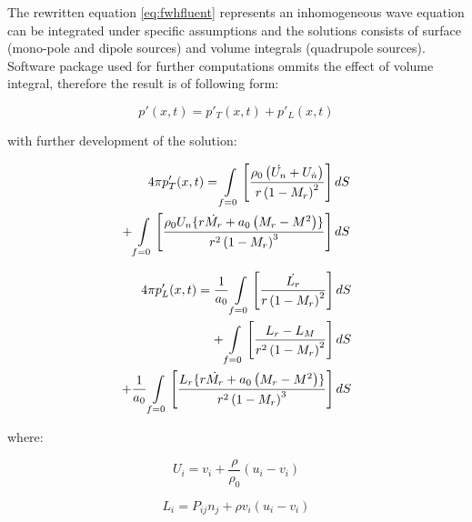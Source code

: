 The rewritten equation \ref{eq:fwhfluent} represents an inhomogeneous wave equation can be integrated under specific assumptions and the solutions consists of surface (mono-pole and dipole sources) and volume integrals (quadrupole sources). Software package used for further computations ommits the effect of volume integral, therefore the result is of following form:

\begin{equation} \label{eq:fwhfluentsolved}
p'(x, t) = p'_T(x, t) + p'_L(x, t)
\end{equation}

\noindent with further development of the solution:

\begin{equation} \label{eq:fwhfluentpt}
\begin{split}
4 \pi p'_T (x, t)
= \int\displaylimits_{f=0} \left[ \frac{ \rho_0 \left( \dot{U_n} + U_{\dot{n}} \right)}{r \left( 1 - M_{r} \right)^{2}} \right] dS \\
+ \int\displaylimits_{f=0} \left[ \frac{\rho_0 U_n \lbrace r \dot{M_r} + a_0 \left( M_r - M^2 \right) \rbrace}{r^2 \left( 1 - M_{r} \right)^{3}} \right] dS
\end{split}
\end{equation}

\begin{equation} \label{eq:fwhfluentpl}
\begin{split}
4 \pi p'_L (x, t)
= \frac{1}{a_0} \int\displaylimits_{f=0} \left[ \frac{\dot{L_r}}{r \left(1 - M_r \right)^2 }\right] dS \\
+ \int\displaylimits_{f=0} \left[ \frac{L_r - L_M}{r^2 \left( 1 - M_r \right)^2 } \right] dS \\
+ \frac{1}{a_0} \int\displaylimits_{f=0} \left[ \frac{L_r \lbrace r \dot{M_r} + a_0 \left( M_r - M^2 \right) \rbrace }{r^2 \left( 1 - M_r \right)^3 } \right] dS
\end{split}
\end{equation}

\noindent where:

\begin{equation} \label{eq:fwhfluentui}
U_i = v_i + \frac{\rho}{\rho_0}\left(u_i - v_i \right)
\end{equation}

\begin{equation} \label{eq:fwhfluentli}
L_i = P_{ij} n_j + \rho v_i \left(u_i - v_i \right)
\end{equation}

